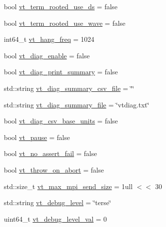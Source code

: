 \begin{DoxyCompactItemize}
\item 
bool \hyperlink{structvt_1_1arguments_1_1_app_config_ae30cd8bb7ca3829fec86f46834a3270c}{vt\+\_\+term\+\_\+rooted\+\_\+use\+\_\+ds} = false
\item 
bool \hyperlink{structvt_1_1arguments_1_1_app_config_ac850fa3db23b49940d9f710c66639189}{vt\+\_\+term\+\_\+rooted\+\_\+use\+\_\+wave} = false
\item 
int64\+\_\+t \hyperlink{structvt_1_1arguments_1_1_app_config_a87132fc94952be73006d525f7d242349}{vt\+\_\+hang\+\_\+freq} = 1024
\item 
bool \hyperlink{structvt_1_1arguments_1_1_app_config_a35f135d830a4bb60edfdebfd33b2f2b4}{vt\+\_\+diag\+\_\+enable} = false
\item 
bool \hyperlink{structvt_1_1arguments_1_1_app_config_a7105cf4ae1b7b6ead255124994d9ea8c}{vt\+\_\+diag\+\_\+print\+\_\+summary} = false
\item 
std\+::string \hyperlink{structvt_1_1arguments_1_1_app_config_a35b0bd57e91e156660d7e5acbcbc8d28}{vt\+\_\+diag\+\_\+summary\+\_\+csv\+\_\+file} = \char`\"{}\char`\"{}
\item 
std\+::string \hyperlink{structvt_1_1arguments_1_1_app_config_a3a345aa1fff61f684a962161c1047856}{vt\+\_\+diag\+\_\+summary\+\_\+file} = \char`\"{}vtdiag.\+txt\char`\"{}
\item 
bool \hyperlink{structvt_1_1arguments_1_1_app_config_a9960924b4253fb072c3a44c9bd3c06ce}{vt\+\_\+diag\+\_\+csv\+\_\+base\+\_\+units} = false
\item 
bool \hyperlink{structvt_1_1arguments_1_1_app_config_a2064c7bded4e44c59316091cd193afc4}{vt\+\_\+pause} = false
\item 
bool \hyperlink{structvt_1_1arguments_1_1_app_config_ac9da4413611abdac83c9bd83722d7d4a}{vt\+\_\+no\+\_\+assert\+\_\+fail} = false
\item 
bool \hyperlink{structvt_1_1arguments_1_1_app_config_aace8ccaee4d2eef85fcf45f132743b64}{vt\+\_\+throw\+\_\+on\+\_\+abort} = false
\item 
std\+::size\+\_\+t \hyperlink{structvt_1_1arguments_1_1_app_config_aac217c9539cf7ee131cedc2c503ef866}{vt\+\_\+max\+\_\+mpi\+\_\+send\+\_\+size} = 1ull $<$$<$ 30
\item 
std\+::string \hyperlink{structvt_1_1arguments_1_1_app_config_a31f3dc5dce040c9c1cd5cba60eb7764d}{vt\+\_\+debug\+\_\+level} = \char`\"{}terse\char`\"{}
\item 
uint64\+\_\+t \hyperlink{structvt_1_1arguments_1_1_app_config_ad62c214067bb5c9165eb8cde688061f8}{vt\+\_\+debug\+\_\+level\+\_\+val} = 0
$$
\end{DoxyCompactItemize}

